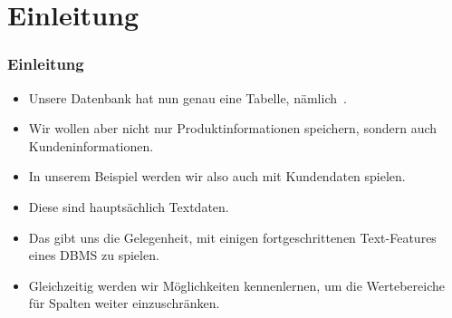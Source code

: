 \documentclass[aspectratio=169,mathserif,notheorems]{beamer}%
\subtitle{10.~Fabrik-Datenbank:~Tabelle \emph{customer}}%
\begin{document}
%
%
\startPresentation%
%
\section{Einleitung}%
%
\begin{frame}%
\frametitle{Einleitung}%
\begin{itemize}%
\item Unsere Datenbank hat nun genau eine Tabelle, nämlich~.%
\item<2-> Wir wollen aber nicht nur Produktinformationen speichern, sondern auch Kundeninformationen.%
\item<3-> In unserem Beispiel werden wir also auch mit Kundendaten spielen.%
\item<4-> Diese sind hauptsächlich Textdaten.%
\item<5-> Das gibt uns die Gelegenheit, mit einigen fortgeschrittenen Text-Features eines DBMS zu spielen.%
\item<6-> Gleichzeitig werden wir Möglichkeiten kennenlernen, um die Wertebereiche für Spalten weiter einzuschränken.%
\end{itemize}%
\end{frame}%
%
\end{document}
